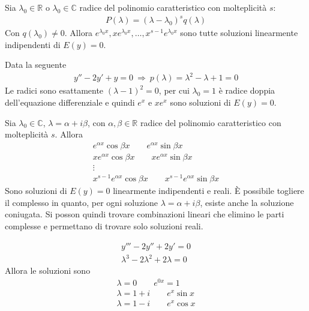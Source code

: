 \documentclass[a4paper, oneside]{book}
\begin{document}
\begin{theorem}
    Sia $\lambda_0 \in \mathbb{R}$ o $\lambda_0 \in \mathbb{C}$ radice del polinomio caratteristico
    con  molteplicità  $s$:
    \begin{gather*}
        P(\lambda) = (\lambda - \lambda_0)^{s}q(\lambda) 
    \end{gather*}
    Con $q(\lambda_0) \neq  0$. Allora $e^{\lambda_0 x}, xe^{\lambda_0 x}, \dots, x^{s - 1}e^{\lambda_0 x}$
    sono tutte soluzioni linearmente indipendenti di $E(y) = 0$.     
\end{theorem}

\begin{example}
    Data la seguente
    \begin{gather*}
        y'' -2y' + y = 0 \ \Longrightarrow \ p(\lambda) = \lambda^{2} - \lambda + 1 = 0 
    \end{gather*}
    Le radici sono esattamente $(\lambda - 1)^{2} = 0$, per cui $\lambda_0 = 1$ è radice doppia dell'equazione
    differenziale e quindi $e^{x}$ e $xe^{x}$ sono soluzioni di $E(y) = 0$.  
\end{example}

\begin{theorem}
    Sia $\lambda_0 \in \mathbb{C}$, $\lambda = \alpha + i \beta$, con $\alpha, \beta \in \mathbb{R}$ radice del polinomio caratteristico 
    con molteplicità $s$. Allora 
    \begin{gather*}
        e^{\alpha x} \cos\beta x \qquad e^{\alpha x}\sin\beta x \\
        xe^{\alpha x}\cos\beta x \qquad xe^{\alpha x}\sin\beta x \\
        \vdots \\
        x^{s - 1}e^{\alpha x}\cos \beta x \qquad x^{s - 1}e^{\alpha x}\sin\beta x         
    \end{gather*} 
    Sono soluzioni di $E(y)= 0$ linearmente indipendenti e reali.
    È possibile togliere il complesso in quanto, per ogni soluzione $\lambda = \alpha + i\beta$,
    esiste anche la soluzione coniugata. Si posson quindi trovare combinazioni lineari che elimino 
    le parti complesse e permettano di trovare solo soluzioni reali. 
\end{theorem}

\begin{example}
    \begin{gather*}
        y''' -2y'' +2y' = 0  \\
        \lambda^{3} -2\lambda^{2} + 2\lambda = 0  
    \end{gather*}
    Allora le soluzioni sono 
    \begin{gather*}
        \lambda = 0 \qquad e^{0 x} = 1 \\ 
        \lambda = 1 + i \qquad e^{x}\sin x \\
        \lambda = 1 - i  \qquad e^{x}\cos x 
    \end{gather*}
\end{example} 
\clearpage
\end{document}
